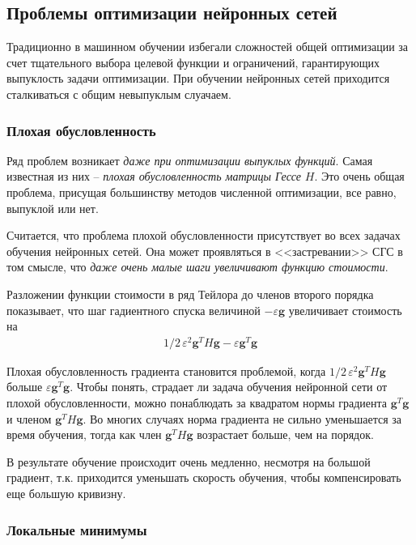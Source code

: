\documentclass[%
	11pt,
	a4paper,
	utf8,
]{article}
\begin{document}
\subsection{Проблемы оптимизации нейронных сетей}

Традиционно в машинном обучении избегали  сложностей общей оптимизации за счет тщательного выбора целевой функции и ограничений, гарантирующих выпуклость задачи оптимизации. При обучении нейронных сетей приходится сталкиваться с общим невыпуклым слуачаем.

\subsubsection{Плохая обусловленность}

Ряд проблем возникает \emph{даже при оптимизации выпуклых функций}. Самая известная из них -- \emph{плохая обусловленность матрицы Гессе} $ H $. Это очень общая проблема, присущая большинству методов численной оптимизации, все равно, выпуклой или нет.

Считается, что проблема плохой обусловленности присутствует во всех задачах обучения нейронных сетей. Она может проявляться в <<застревании>> СГС в том смысле, что \emph{даже очень малые шаги увеличивают функцию стоимости}.

Разложении функции стоимости в ряд Тейлора до членов второго порядка показывает, что шаг гадиентного спуска величиной $ - \varepsilon \mathbf{g} $ увеличивает стоимость на
\begin{align*}
	1 / 2 \, \varepsilon^2 \mathbf{g}^T H \mathbf{g} - \varepsilon \mathbf{g}^T \mathbf{g}
\end{align*}

Плохая обусловленность градиента становится проблемой, когда $ 1 / 2 \, \varepsilon^2  \mathbf{g}^T H \mathbf{g} $ больше $ \varepsilon \mathbf{g}^T \mathbf{g} $. Чтобы понять, страдает ли задача обучения нейронной сети от плохой обусловленности, можно понаблюдать за квадратом нормы градиента $ \mathbf{g}^T \mathbf{g} $ и членом $ \mathbf{g}^T H \mathbf{g} $. Во многих случаях норма градиента не сильно уменьшается за время обучения, тогда как член $ \mathbf{g}^T H \mathbf{g} $ возрастает больше, чем на порядок.

В результате обучение происходит очень медленно, несмотря на большой градиент, т.к.  приходится уменьшать скорость обучения, чтобы компенсировать еще большую кривизну.

\subsubsection{Локальные минимумы}
\end{document}
